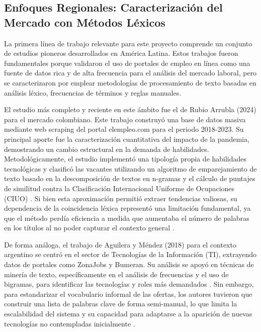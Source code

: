 \subsection{Enfoques Regionales: Caracterización del Mercado con Métodos Léxicos}

La primera línea de trabajo relevante para este proyecto comprende un conjunto de estudios pioneros desarrollados en América Latina. Estos trabajos fueron fundamentales porque validaron el uso de portales de empleo en línea como una fuente de datos rica y de alta frecuencia para el análisis del mercado laboral, pero se caracterizaron por emplear metodologías de procesamiento de texto basadas en análisis léxico, frecuencias de términos y reglas manuales.

El estudio más completo y reciente en este ámbito fue el de Rubio Arrubla (2024) para el mercado colombiano. Este trabajo construyó una base de datos masiva mediante web scraping del portal elempleo.com para el periodo 2018-2023. Su principal aporte fue la caracterización cuantitativa del impacto de la pandemia, demostrando un cambio estructural en la demanda de habilidades. Metodológicamente, el estudio implementó una tipología propia de habilidades tecnológicas y clasificó las vacantes utilizando un algoritmo de emparejamiento de texto basado en la descomposición de textos en n-gramas y el cálculo de puntajes de similitud contra la Clasificación Internacional Uniforme de Ocupaciones (CIUO) \parencite{rubio2024}. Si bien esta aproximación permitió extraer tendencias valiosas, su dependencia de la coincidencia léxica representó una limitación fundamental, ya que el método perdía eficiencia a medida que aumentaba el número de palabras en los títulos al no poder capturar el contexto general \parencite{rubio2024}.

De forma análoga, el trabajo de Aguilera y Méndez (2018) para el contexto argentino se centró en el sector de Tecnologías de la Información (TI), extrayendo datos de portales como ZonaJobs y Bumeran. Su análisis se apoyó en técnicas de minería de texto, específicamente en el análisis de frecuencias y el uso de bigramas, para identificar las tecnologías y roles más demandados \parencite{aguilera2018}. Sin embargo, para estandarizar el vocabulario informal de las ofertas, los autores tuvieron que construir una lista de palabras clave de forma semi-manual, lo que limita la escalabilidad del sistema y su capacidad para adaptarse a la aparición de nuevas tecnologías no contempladas inicialmente \parencite{aguilera2018}.

